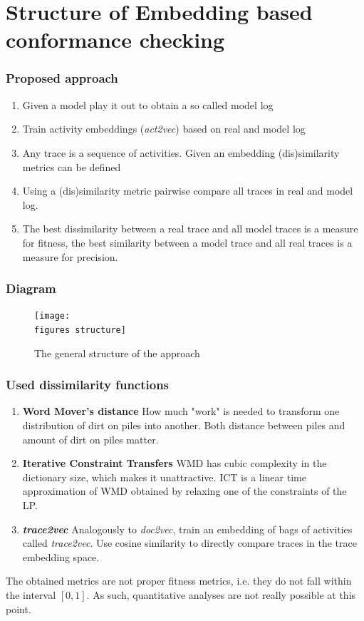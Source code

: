 \documentclass{beamer}
\newcommand{\figures}{../figures/}
\begin{document}
	\section{Structure of Embedding based conformance checking}
\begin{frame}
	\frametitle{Proposed approach}
	\begin{enumerate}
		\item Given a model play it out to obtain a so called model log
		\item Train activity embeddings (\emph{act2vec}) based on real and model log
		\item Any trace is a sequence of activities. Given an embedding (dis)similarity metrics can be defined
		\item Using a (dis)similarity metric pairwise compare all traces in real and model log.
		\item The best dissimilarity between a real trace and all model traces is a measure for fitness, the best similarity between a model trace and all real traces is a measure for precision.
	\end{enumerate}
\end{frame}
	
	
	\begin{frame}
		\frametitle{Diagram}
		\begin{figure}
			\texttt{[image: \\figures structure]}
			\caption{The general structure of the approach}
			\label{fig:structure}
		\end{figure}
	\end{frame}
	
	
	\begin{frame}
		\frametitle{Used dissimilarity functions}
		\begin{enumerate}
			\item \textbf{Word Mover's distance} \cite{KSKW15} How much "work" is needed to transform one distribution of dirt on piles into another. Both distance between piles and amount of dirt on piles matter.
			\item \textbf{Iterative Constraint Transfers} \cite{AtMi18} WMD has cubic complexity in the dictionary size, which makes it unattractive. ICT is a linear time approximation of WMD obtained by relaxing one of the constraints of the LP.
			\item \textbf{\emph{trace2vec}} \cite{KBWe18} Analogously to \emph{doc2vec}, train an embedding of bags of activities called \emph{trace2vec}. Use cosine similarity to directly compare traces in the trace embedding space.
		\end{enumerate}
	\alert{The obtained metrics are not proper fitness metrics, i.e. they do not fall within the interval $[0,1]$. As such, quantitative analyses are not really possible at this point.}
	\end{frame}
	
\end{document}
